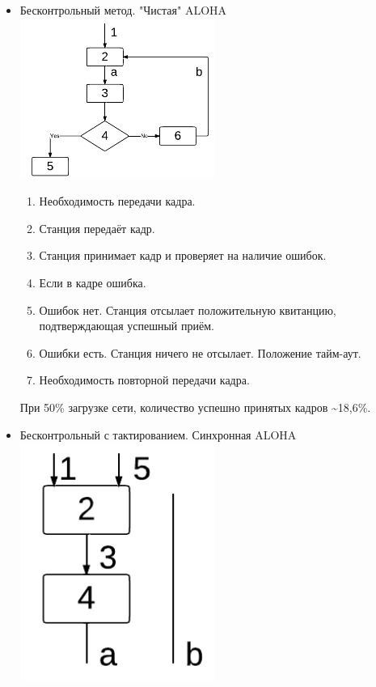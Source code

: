 \documentclass[12pt, russian, oneside, article]{ncc}
\begin{document}
\begin{itemize}

\item Бесконтрольный метод. "Чистая" ALOHA\\
\label{sec-5_1_1_1}%
\includegraphics[width=0.5\textwidth]{images/SiSPI/aloha.png}

\begin{enumerate}
\item Необходимость передачи кадра.
\item Станция передаёт кадр.
\item Станция принимает кадр и проверяет на наличие ошибок.
\item Если в кадре ошибка.
\item Ошибок нет. Станция отсылает положительную квитанцию, подтверждающая успешный приём.
\item Ошибки есть. Станция ничего не отсылает. Положение тайм-аут.
\item Необходимость повторной передачи кадра.
\end{enumerate}

При 50\% загрузке сети, количество успешно принятых кадров \~{}18,6\%.


\item Бесконтрольный с тактированием. Синхронная ALOHA\\
\label{sec-5_1_1_2}%
\includegraphics[width=0.5\textwidth]{images/SiSPI/sincaloha.png}


\end{itemize}
\end{document}
